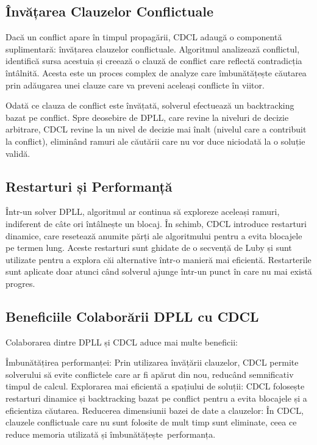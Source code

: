 \documentclass[runningheads]{llncs}
\begin{document}
\subsection{Învățarea Clauzelor Conflictuale}
Dacă un conflict apare în timpul propagării, CDCL adaugă o componentă suplimentară: învățarea clauzelor conflictuale. Algoritmul analizează conflictul, identifică sursa acestuia și creează o clauză de conflict care reflectă contradicția întâlnită. Acesta este un proces complex de analyze care îmbunătățește căutarea prin adăugarea unei clauze care va preveni aceleași conflicte în viitor.

Odată ce clauza de conflict este învățată, solverul efectuează un backtracking bazat pe conflict. Spre deosebire de DPLL, care revine la niveluri de decizie arbitrare, CDCL revine la un nivel de decizie mai înalt (nivelul care a contribuit la conflict), eliminând ramuri ale căutării care nu vor duce niciodată la o soluție validă.

\subsection{Restarturi și Performanță}
Într-un solver DPLL, algoritmul ar continua să exploreze aceleași ramuri, indiferent de câte ori întâlnește un blocaj. În schimb, CDCL introduce restarturi dinamice, care resetează anumite părți ale algoritmului pentru a evita blocajele pe termen lung. Aceste restarturi sunt ghidate de o secvență de Luby și sunt utilizate pentru a explora căi alternative într-o manieră mai eficientă. Restarterile sunt aplicate doar atunci când solverul ajunge într-un punct în care nu mai există progres.

\newpage

\subsection{Beneficiile Colaborării DPLL cu CDCL}

Colaborarea dintre DPLL și CDCL aduce mai multe beneficii:

Îmbunătățirea performanței: Prin utilizarea învățării clauzelor, CDCL permite solverului să evite conflictele care ar fi apărut din nou, reducând semnificativ timpul de calcul.
Explorarea mai eficientă a spațiului de soluții: CDCL folosește restarturi dinamice și backtracking bazat pe conflict pentru a evita blocajele și a eficientiza căutarea.
Reducerea dimensiunii bazei de date a clauzelor: În CDCL, clauzele conflictuale care nu sunt folosite de mult timp sunt eliminate, ceea ce reduce memoria utilizată și îmbunătățește performanța.
 
\end{document}
